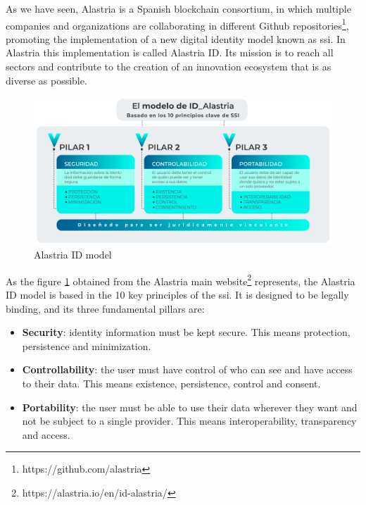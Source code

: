 As we have seen, Alastria is a Spanish blockchain consortium, in which multiple companies and organizations are collaborating in different Github repositories\footnote{https://github.com/alastria}, promoting the implementation of a new digital identity model known as \acrlong{ssi}. In Alastria this implementation is called Alastria ID. Its mission is to reach all sectors and contribute to the creation of an innovation ecosystem that is as diverse as possible. \\

\begin{figure}[h]
    \centering
    \includegraphics[width=1.0\textwidth]{images/Alastria ID/pilares_alastria.png}
    \caption{Alastria ID model}
    \label{fig:pilares_alastria}
\end{figure}

As the figure \ref{fig:pilares_alastria} obtained from the Alastria main website\footnote{https://alastria.io/en/id-alastria/} represents, the Alastria ID model is based in the 10 key principles of the \acrshort{ssi}. It is designed to be legally binding, and its three fundamental pillars are:
\begin{itemize}
    \item \textbf{Security}: identity information must be kept secure. This means protection, persistence and minimization.
    \item \textbf{Controllability}: the user must have control of who can see and have access to their data. This means existence, persistence, control and consent.
    \item \textbf{Portability}: the user must be able to use their data wherever they want and not be subject to a single provider. This means interoperability, transparency and access.
\end{itemize}

